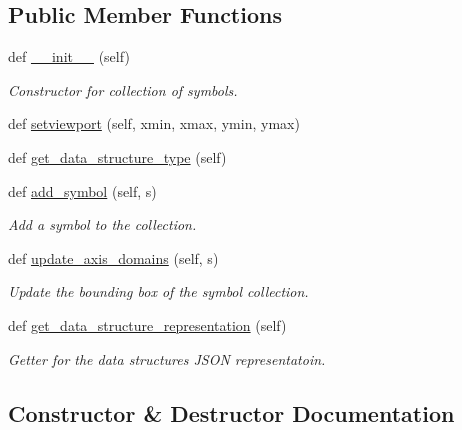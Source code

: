 \subsection*{Public Member Functions}
\begin{DoxyCompactItemize}
\item 
def \hyperlink{classbridges_1_1symbol__collection_1_1_symbol_collection_a7ba838d831a2dce6d74fe920c7de52fd}{\+\_\+\+\_\+init\+\_\+\+\_\+} (self)
\begin{DoxyCompactList}\small\item\em Constructor for collection of symbols. \end{DoxyCompactList}\item 
def \hyperlink{classbridges_1_1symbol__collection_1_1_symbol_collection_ac17f093a6731545509d5b5e94484ab7a}{setviewport} (self, xmin, xmax, ymin, ymax)
\item 
def \hyperlink{classbridges_1_1symbol__collection_1_1_symbol_collection_a84a2d68da2df79389b6bec06ee99f72d}{get\+\_\+data\+\_\+structure\+\_\+type} (self)
\item 
def \hyperlink{classbridges_1_1symbol__collection_1_1_symbol_collection_a11e36a56b1d7dbf23175d4b1ab3cd378}{add\+\_\+symbol} (self, s)
\begin{DoxyCompactList}\small\item\em Add a symbol to the collection. \end{DoxyCompactList}\item 
def \hyperlink{classbridges_1_1symbol__collection_1_1_symbol_collection_af0906b48ee3ee868bb7779561d3f710c}{update\+\_\+axis\+\_\+domains} (self, s)
\begin{DoxyCompactList}\small\item\em Update the bounding box of the symbol collection. \end{DoxyCompactList}\item 
def \hyperlink{classbridges_1_1symbol__collection_1_1_symbol_collection_a09fb16fe5f14457654e5f2680131ccc9}{get\+\_\+data\+\_\+structure\+\_\+representation} (self)
\begin{DoxyCompactList}\small\item\em Getter for the data structure\textquotesingle{}s J\+S\+ON representatoin. \end{DoxyCompactList}\end{DoxyCompactItemize}


\subsection{Constructor \& Destructor Documentation}
\mbox{\label{classbridges_1_1symbol__collection_1_1_symbol_collection_a7ba838d831a2dce6d74fe920c7de52fd}} 

